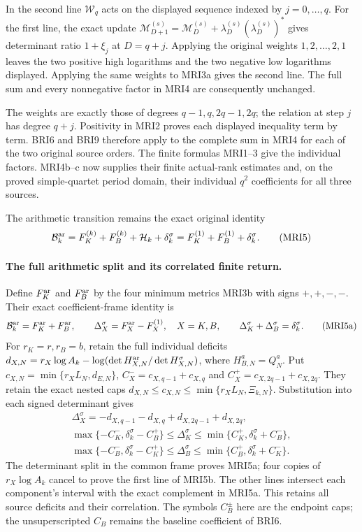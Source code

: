 \documentclass[11pt,a4paper]{article}
\begin{document}
In the second line $\mathcal W_q$ acts on the displayed sequence
indexed by $j=0,\ldots,q$. For the first line, the exact update
$\mathcal M_{D+1}^{(s)}=\mathcal M_D^{(s)}
+\lambda_D^{(s)}(\lambda_D^{(s)})^*$ gives determinant ratio
$1+\xi_j$ at $D=q+j$. Applying the original weights
$1,2,\ldots,2,1$ leaves the two positive high logarithms and
the two negative low logarithms displayed. Applying the same
weights to MRI3a gives the second line. The full sum and every
nonnegative factor in MRI4 are consequently unchanged.

The weights are exactly those of degrees $q-1,q,2q-1,2q$;
the relation at step $j$ has degree $q+j$. Positivity in MRI2
proves each displayed inequality term by term. BRI6 and BRI9
therefore apply to the complete sum in MRI4 for each of the
two original source orders. The finite formulas MRI1--3 give
the individual factors. MRI4b--c now supplies their finite
actual-rank estimates and, on the proved simple-quartet period
domain, their individual $q^2$ coefficients for all three sources.

The arithmetic transition remains the exact original identity
\[
 \mathcal B_k^{\rm ar}
   =F_K^{(k)}+F_B^{(k)}+\mathcal H_k+\delta_k^\sigma
   =F_K^{(1)}+F_B^{(1)}+\delta_k^\sigma.
 \tag{MRI5}
\]

\paragraph{The full arithmetic split and its correlated finite return.}
Define $F_K^{\rm ar}$ and $F_B^{\rm ar}$ by the four
minimum metrics MRI3b with signs $+,+,-,-$. Their exact
coefficient-frame identity is
\[
 \mathcal B_k^{\rm ar}=F_K^{\rm ar}+F_B^{\rm ar},\qquad
 \Delta_X^\sigma=F_X^{\rm ar}-F_X^{(1)},\quad X=K,B,
 \qquad\Delta_K^\sigma+\Delta_B^\sigma=\delta_k^\sigma.
 \tag{MRI5a}
\]
For $r_K=r,r_B=b$, retain the full individual deficits
$d_{X,N}=r_X\log A_k-\log(\det H_{X,N}^{\rm ar}/
\det H_{X,N}^\sigma)$, where $H_{B,N}^a=Q_N^a$.
Put $c_{X,N}=\min\{r_XL_N,d_{E,N}\}$,
$C_X^-=c_{X,q-1}+c_{X,q}$ and
$C_X^+=c_{X,2q-1}+c_{X,2q}$. They retain the exact nested
caps $d_{X,N}\le c_{X,N}\le\min\{r_XL_N,\Xi_{k,N}\}$.
Substitution into each signed determinant gives
\[
\begin{gathered}
 \Delta_X^\sigma=-d_{X,q-1}-d_{X,q}+d_{X,2q-1}+d_{X,2q},\\
 \max\{-C_K^-,\delta_k^\sigma-C_B^+\}
  \le\Delta_K^\sigma\le
          \min\{C_K^+,\delta_k^\sigma+C_B^-\},\\
 \max\{-C_B^-,\delta_k^\sigma-C_K^+\}
  \le\Delta_B^\sigma\le
          \min\{C_B^+,\delta_k^\sigma+C_K^-\}.
\end{gathered}\tag{MRI5b}
\]
The determinant split in the common frame proves MRI5a;
four copies of $r_X\log A_k$ cancel to prove the first
line of MRI5b. The other lines intersect each component's
interval with the exact complement in MRI5a. This retains
all source deficits and their correlation. The symbols
$C_B^\pm$ here are the endpoint caps; the unsuperscripted
$C_B$ remains the baseline coefficient of BRI6.
\end{document}
